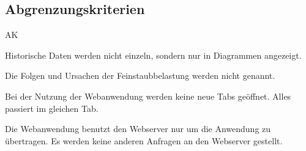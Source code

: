 \subsection{Abgrenzungskriterien}
\setcounter{counter}{10}
\begin{Kriterien}{AK}

	\item Historische Daten werden nicht einzeln, sondern nur in Diagrammen angezeigt.
	
	\item Die Folgen und Ursachen der Feinstaubbelastung werden nicht genannt.
	
	\item Bei der Nutzung der \gls{Webanwendung} werden keine neue Tabs geöffnet. Alles passiert im gleichen Tab.
	
	\item Die \gls{Webanwendung} benutzt den \gls{Webserver} nur um die Anwendung zu übertragen. 
		Es werden keine anderen Anfragen an den \gls{Webserver} gestellt.
	
\end{Kriterien}
